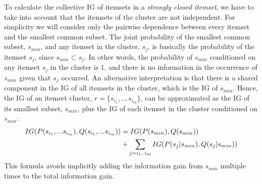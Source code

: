\documentclass[letterpaper,12pt,titlepage,oneside,final]{book}
\begin{document}
To calculate the collective IG of itemsets in a \emph{strongly closed itemset},
we have to take into account that the itemsets of the cluster are not independent. 
For simplicity we will consider only the pairwise dependence between 
every itemset and the smallest common subset.
The joint probability of the smallest common subset, $s_{min}$,
and any itemset in the cluster, $s_{j}$, is basically the probability of the itemset $s_{j}$,
since $s_{min} \subset s_{j}$. %
In other words, the probability of $s_{min}$ conditioned
on any itemset $s_{j}$ in the cluster is 1,
and there is no information in the occurrence
of $s_{min}$ given that $s_{j}$ occurred.
An alternative interpretation is that
there is a shared component in the IG of all itemsets in the cluster,
which is the IG of $s_{min}$.
Hence, the IG of an itemset cluster,
$r=\{s_{i_1},..,s_{i_m}\}$, 
can be approximated as the IG of its smallest subset, $s_{min}$,
plus the IG of each itemset in the cluster conditioned on $s_{min}$:
\begin{align}
IG(P(s_{i_1},...s_{i_m}),Q(s_{i_1},...s_{i_m})) &= IG(P(s_{min}), Q(s_{min})) \notag \\
&+ \sum_{j = i_1..i_m}{IG(P(s_j|s_{min}), Q(s_j|s_{min}))}
\end{align} 
This formula avoids implicitly adding the information gain from $s_{min}$
multiple times to the total information gain. %
\end{document}
